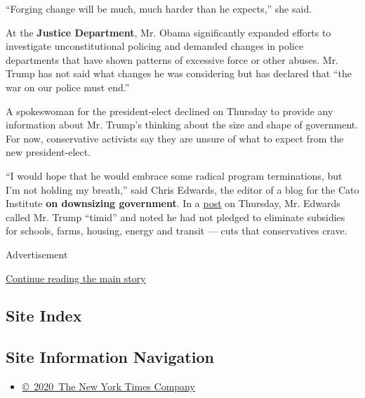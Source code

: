 ``Forging change will be much, much harder than he expects,'' she said.

At the \textbf{Justice Department}, Mr. Obama significantly expanded
efforts to investigate unconstitutional policing and demanded changes in
police departments that have shown patterns of excessive force or other
abuses. Mr. Trump has not said what changes he was considering but has
declared that ``the war on our police must end.''

A spokeswoman for the president-elect declined on Thursday to provide
any information about Mr. Trump's thinking about the size and shape of
government. For now, conservative activists say they are unsure of what
to expect from the new president-elect.

``I would hope that he would embrace some radical program terminations,
but I'm not holding my breath,'' said Chris Edwards, the editor of a
blog for the Cato Institute \textbf{on downsizing government}. In a
\href{https://www.cato.org/blog/trump-spending-cut-ideas}{post} on
Thursday, Mr. Edwards called Mr. Trump ``timid'' and noted he had not
pledged to eliminate subsidies for schools, farms, housing, energy and
transit --- cuts that conservatives crave.

Advertisement

\protect\hyperlink{after-bottom}{Continue reading the main story}

\hypertarget{site-index}{%
\subsection{Site Index}\label{site-index}}

\hypertarget{site-information-navigation}{%
\subsection{Site Information
Navigation}\label{site-information-navigation}}

\begin{itemize}
\tightlist
\item
  \href{https://help.nytimes.com/hc/en-us/articles/115014792127-Copyright-notice}{©~2020~The
  New York Times Company}
\end{itemize}

